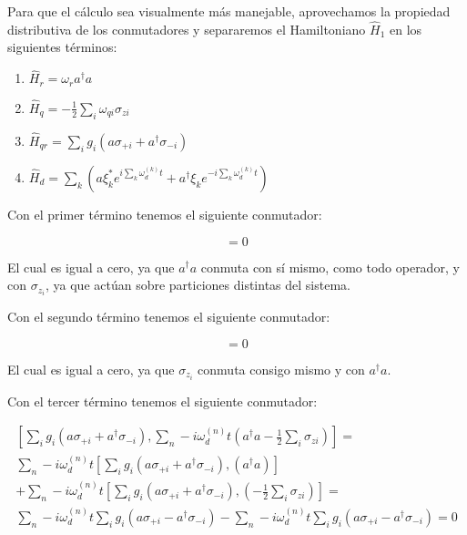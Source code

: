 Para que el cálculo sea visualmente más manejable, aprovechamos la propiedad distributiva de los conmutadores y separaremos el Hamiltoniano $\hat{H}_1$ en los siguientes términos:

\begin{enumerate}
    \item $\hat{H}_r = \omega_r a^\dag a$
    \item $\hat{H}_q = - \frac{1}{2} \sum\limits_i \omega_{qi} \sigma_{zi}$
    \item $\hat{H}_{qr} = \sum\limits_i g_i (a \sigma_{+ i} + a^\dagger \sigma_{- i})$
    \item $\hat{H}_d = \sum\limits_k (a\xi_k^*e^{i\sum\limits_k \omega_d^{(k)}t}+ a^\dagger\xi_ke^{-i\sum\limits_k \omega_d^{(k)}t})$
\end{enumerate}


Con el primer término tenemos el siguiente conmutador:

\begin{equation}
    [\omega_r a^\dag a, \sum\limits_n-i \omega_d^{(n)} t(a^\dagger a - \frac{1}{2} \sum\limits_i \sigma_{z i})] = 0
\end{equation}

El cual es igual a cero, ya que $a^\dagger a$ conmuta con sí mismo, como todo operador, y con $\sigma_{z_i}$, ya que actúan sobre particiones distintas del sistema.

Con el segundo término tenemos el siguiente conmutador:

\begin{equation}
    [- \frac{1}{2} \sum\limits_i \omega_{qi} \sigma_{zi} , \sum\limits_n-i \omega_d^{(n)} t(a^\dagger a - \frac{1}{2} \sum\limits_i \sigma_{z i})] = 0
\end{equation}

El cual es igual a cero, ya que $\sigma_{z_i}$ conmuta consigo mismo y con $a^\dagger a$.

Con el tercer término tenemos el siguiente conmutador:

\begin{multline}
\left[\sum\limits_i g_i (a \sigma_{+ i} + a^\dagger \sigma_{- i}), \sum\limits_n-i \omega_d^{(n)} t(a^\dagger a - \frac{1}{2} \sum\limits_i \sigma_{z i})\right] = \\
\sum\limits_n-i \omega_d^{(n)} t \left[\sum\limits_i g_i (a \sigma_{+ i} + a^\dagger \sigma_{- i}), (a^\dagger a)\right] \\
+ \sum\limits_n-i \omega_d^{(n)} t \left[\sum\limits_i g_i (a \sigma_{+ i} + a^\dagger \sigma_{- i}), (- \frac{1}{2} \sum\limits_i \sigma_{z i})\right] = \\
\sum\limits_n-i \omega_d^{(n)} t \sum\limits_i g_i (a \sigma_{+ i} - a^\dagger \sigma_{- i})
- \sum\limits_n-i \omega_d^{(n)} t \sum\limits_i g_i (a \sigma_{+ i} - a^\dagger \sigma_{- i}) = 0
\end{multline}

